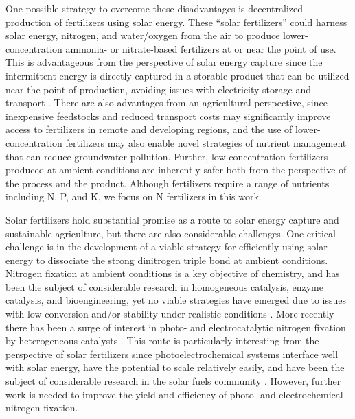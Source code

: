 One possible strategy to overcome these disadvantages is decentralized production of fertilizers using solar energy. These ``solar fertilizers'' could harness solar energy, nitrogen, and water/oxygen from the air to produce lower-concentration ammonia- or nitrate-based fertilizers at or near the point of use. This is advantageous from the perspective of solar energy capture since the intermittent energy is directly captured in a storable product that can be utilized near the point of production, avoiding issues with electricity storage and transport \cite{MacKay_2013}. There are also advantages from an agricultural perspective, since inexpensive feedstocks and reduced transport costs may significantly improve access to fertilizers in remote and developing regions, and the use of lower-concentration fertilizers may also enable novel strategies of nutrient management that can reduce groundwater pollution. Further, low-concentration fertilizers produced at ambient conditions are inherently safer both from the perspective of the process and the product. Although fertilizers require a range of nutrients including N, P, and K, we focus on N fertilizers in this work.%

Solar fertilizers hold substantial promise as a route to solar energy capture and sustainable agriculture, but there are also considerable challenges. One critical challenge is in the development of a viable strategy for efficiently using solar energy to dissociate the strong dinitrogen triple bond at ambient conditions. Nitrogen fixation at ambient conditions is a key objective of chemistry, and has been the subject of considerable research in homogeneous catalysis, enzyme catalysis, and bioengineering, yet no viable strategies have emerged due to issues with low conversion and/or stability under realistic conditions \cite{Vicente_2017,Bur_n_2017,MacLeod_2013,Foster2018}. %
More recently there has been a surge of interest in photo- and electrocatalytic nitrogen fixation by heterogeneous catalysts \cite{Medford_2017,Kyriakou_2017,Foster_2018,Chen_2018}. This route is particularly interesting from the perspective of solar fertilizers since photoelectrochemical systems interface well with solar energy, have the potential to scale relatively easily, and have been the subject of considerable research in the solar fuels community \cite{Kondratenko2013}. However, further work is needed to improve the yield and efficiency of photo- and electrochemical nitrogen fixation. %

